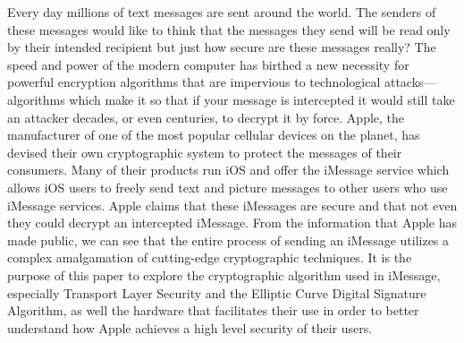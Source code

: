 Every day millions of text messages are sent around the world.  The senders of
these messages would like to think that the messages they send will be read
only by their intended recipient but just how secure are these messages really?
The speed and power of the modern computer has birthed a new necessity for
powerful encryption algorithms that are impervious to technological attacks---
algorithms which make it so that if your message is intercepted it would still
take an attacker decades, or even centuries, to decrypt it by force.  Apple,
the manufacturer of one of the most popular cellular devices on the planet, has
devised their own cryptographic system to protect the messages of their
consumers.  Many of their products run iOS and offer the iMessage service which
allows iOS users to freely send text and picture messages to other users who
use iMessage services.  Apple claims that these iMessages are secure and that
not even they could decrypt an intercepted iMessage.  From the information that
Apple has made public, we can see that the entire process of sending an iMessage
utilizes a complex amalgamation of cutting-edge cryptographic techniques.  It
is the purpose of this paper to explore the cryptographic algorithm used in
iMessage, especially Transport Layer Security and the Elliptic Curve Digital
Signature Algorithm, as well the hardware that facilitates their use in order
to better understand how Apple achieves a high level security of their users.
